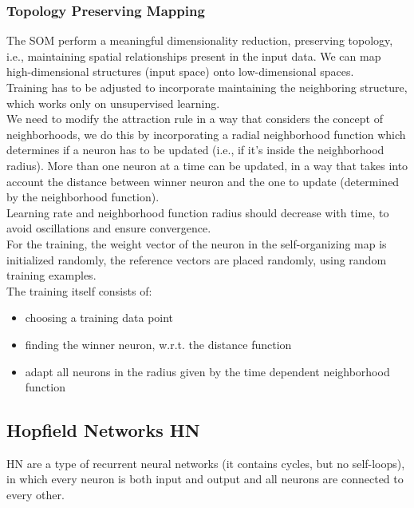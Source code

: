\subsubsection{Topology Preserving Mapping}
The SOM perform a meaningful dimensionality reduction, preserving topology, i.e., maintaining spatial relationships present in the input data. We can map high-dimensional structures (input space) onto low-dimensional spaces.\\

Training has to be adjusted to incorporate maintaining the neighboring structure, which works only on unsupervised learning.\\

We need to modify the attraction rule in a way that considers the concept of neighborhoods, we do this by incorporating a radial neighborhood function which determines if a neuron has to be updated (i.e., if it's inside the neighborhood radius). More than one neuron at a time can be updated, in a way that takes into account the distance between winner neuron and the one to update (determined by the neighborhood function).\\

Learning rate and neighborhood function radius should decrease with time, to avoid oscillations and ensure convergence.\\

For the training, the weight vector of the neuron in the self-organizing map is initialized randomly, the reference vectors are placed randomly, using random training examples.\\
The training itself consists of:
\begin{itemize}
	\item choosing a training data point
	\item finding the winner neuron, w.r.t. the distance function
	\item adapt all neurons in the radius given by the time dependent neighborhood function 
\end{itemize}

\subsection{Hopfield Networks HN}

HN are a type of recurrent neural networks (it contains cycles, but no self-loops), in which every neuron is both input and output and all neurons are connected to every other.\\


